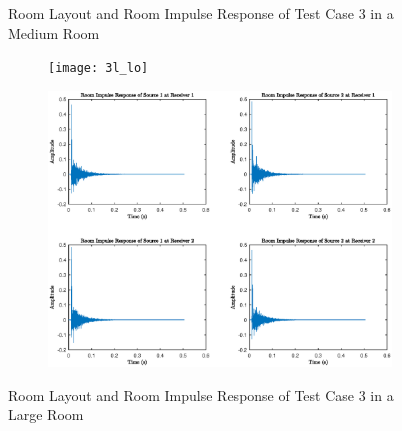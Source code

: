 \documentclass[a4paper,twoside,12pt,hidelinks]{article}
\begin{document}
\begin{appendices}
\begin{figure}[H]
\begin{subfigure}[H]{0.55\textwidth}
\end{subfigure}
\caption{Room Layout and Room Impulse Response of Test Case 3 in a Medium Room}
\end{figure}
\begin{figure}[H]
\centering
\begin{subfigure}[H]{0.44\textwidth}
\texttt{[image: 3l\_lo]}
\end{subfigure}
\begin{subfigure}[H]{0.55\textwidth}
\includegraphics[width=\textwidth]{3l_ir}
\end{subfigure}
\caption{Room Layout and Room Impulse Response of Test Case 3 in a Large Room}
\end{figure}
\clearpage
\end{appendices}
\end{document}
